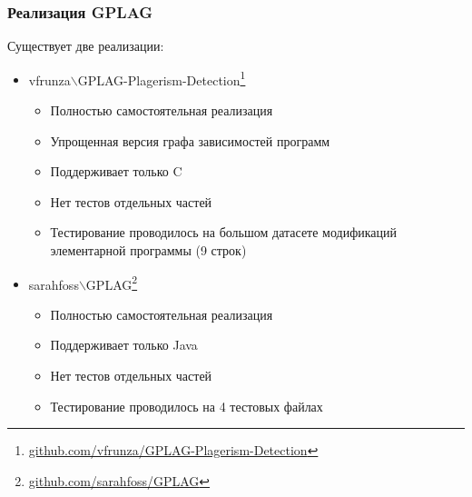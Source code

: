 \documentclass[10pt]{beamer}
\begin{document}
\begin{frame}\frametitle{Реализация GPLAG}
	Существует две реализации:
	\begin{itemize}
		\item vfrunza$\backslash$GPLAG-Plagerism-Detection\footnote[13,frame]{\href{https://github.com/vfrunza/GPLAG-Plagerism-Detection}{\color{blue}github.com/vfrunza/GPLAG-Plagerism-Detection}}
		\begin{itemize}
			\item Полностью самостоятельная реализация
			\item Упрощенная версия графа зависимостей программ
			\item Поддерживает только C
			\item Нет тестов отдельных частей
			\item Тестирование проводилось на большом датасете модификаций элементарной программы (9 строк)
		\end{itemize}
	    \item sarahfoss$\backslash$GPLAG\footnote[14,frame]{\href{https://github.com/sarahfoss/GPLAG}{\color{blue}github.com/sarahfoss/GPLAG}}
	    \begin{itemize}
	    	\item Полностью самостоятельная реализация
	    	\item Поддерживает только Java
	    	\item Нет тестов отдельных частей
	    	\item Тестирование проводилось на 4 тестовых файлах
	    \end{itemize}
	\end{itemize}
\end{frame}
\end{document}
